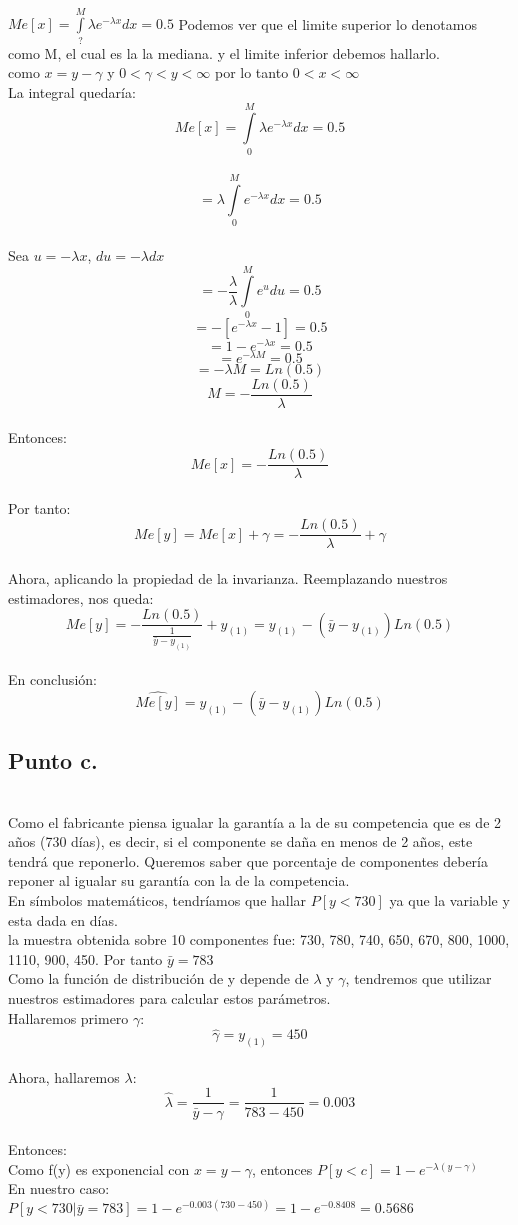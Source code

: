 \documentclass[letterpaper,12pt,onecolumn,titlepage]{article}
\begin{document}
~\\ $Me[x]=\int \limits_{?}^{M}\lambda e^{-\lambda x}dx=0.5$  Podemos ver que el limite superior lo denotamos como M, el cual es la la mediana. y el limite inferior debemos hallarlo.
~\\ como $x=y-\gamma$ y $0<\gamma<y<\infty$ por lo tanto $0<x<\infty$
~\\ La integral quedar\'{i}a:
~\\ $$Me[x]=\int \limits_{0}^{M}\lambda e^{-\lambda x}dx=0.5$$
~\\ $$=\lambda \int \limits_{0}^{M} e^{-\lambda x}dx=0.5$$ 
~\\ Sea $u=-\lambda x$, $du=-\lambda dx$
~\\ $$=-\frac{\lambda}{\lambda}\int \limits_{0}^{M} e^{u} du=0.5$$
$$=-[e^{-\lambda x}-1]=0.5$$
$$=1-e^{-\lambda x}=0.5$$
$$=e^{-\lambda M}=0.5$$
$$=-\lambda M=Ln(0.5)$$
$$M=-\frac{Ln(0.5)}{\lambda}$$
~\\ Entonces:
$$Me[x]=-\frac{Ln(0.5)}{\lambda}$$
~\\ Por tanto:
$$Me[y]=Me[x]+\gamma=-\frac{Ln(0.5)}{\lambda}+\gamma$$
~\\ Ahora, aplicando la propiedad de la invarianza. Reemplazando nuestros estimadores, nos queda:
~\\ $$Me[y]=-\frac{Ln(0.5)}{\frac{1}{\bar{y}-y_{(1)}}}+y_{(1)}=y_{(1)}-(\bar{y}-y_{(1)})Ln(0.5)$$
~\\En conclusi\'{o}n:
$$\hat{Me[y]}=y_{(1)}-(\bar{y}-y_{(1)})Ln(0.5)$$
\subsection{Punto c.} 
~\\ Como el fabricante piensa igualar la garant\'{i}a a la de su competencia que es de 2 a\~{n}os (730 d\'{i}as), es decir, si el componente se da\~{n}a en menos de 2 a\~{n}os, este tendr\'{a} que reponerlo. Queremos saber que porcentaje de componentes deber\'{i}a reponer al igualar su garant\'{i}a con la de la competencia.
~\\ En s\'{i}mbolos matem\'{a}ticos, tendr\'{i}amos que hallar $P[y<730]$ ya que la variable y esta dada en d\'{i}as.
~\\ la muestra obtenida sobre 10 componentes fue: 730, 780, 740, 650, 670, 800, 1000, 1110, 900, 450. Por tanto $\bar{y}=783$
~\\ Como la funci\'{o}n de distribuci\'{o}n de y depende de $\lambda$ y $\gamma$, tendremos que utilizar nuestros estimadores para calcular estos par\'{a}metros.
~\\ Hallaremos primero $\gamma$:
~\\ $$\hat{\gamma}=y_{(1)}=450$$
~\\ Ahora, hallaremos $\lambda$:
 $$\hat{\lambda}=\frac{1}{\bar{y}-\gamma}=\frac{1}{783-450}=0.003$$
~\\ Entonces: 
~\\ Como f(y) es exponencial con $x=y-\gamma$, entonces $P[y<c]=1-e^{-\lambda(y-\gamma)}$
~\\ En nuestro caso:
~\\ $P[y<730|\bar{y}=783]=1-e^{-0.003(730-450)}=1-e^{-0.8408}=0.5686$
\end{document}
